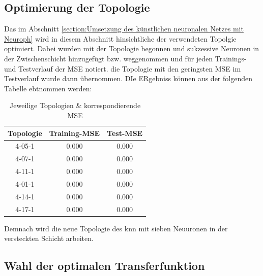 \subsection{Optimierung der Topologie}
Das im Abschnitt \ref{section:Umsetzung des künstlichen neuronalen Netzes mit Neuroph} wird in diesem Abschnitt hinsichtliche der verwendeten Topolgie optimiert. Dabei wurden mit der Topologie begonnen und sukzessive Neuronen in der Zwischenschicht hinzugefügt bzw. weggenommen und für jeden Trainings- und Testverlauf der MSE notiert. die Topologie mit den geringsten MSE im Testverlauf wurde dann übernommen. DIe ERgebniss können aus der folgenden Tabelle ebtnommen werden:


\begin{table}[H]
  \centering
  \begin{tabular}{|c|c|c|}
  \hline 
  \rule[0ex]{0pt}{2.5ex} Topologie & Training-MSE & Test-MSE \\ 
  \hline 
  \rule[0ex]{0pt}{2.5ex} 4-05-1 & 0.000 & 0.000 \\ 
  \hline 
  \rule[0ex]{0pt}{2.5ex} 4-07-1 & 0.000 & 0.000 \\ 
  \hline 
  \rule[0ex]{0pt}{2.5ex} 4-11-1 & 0.000 & 0.000 \\ 
  \hline 
   \rule[0ex]{0pt}{2.5ex} 4-01-1 & 0.000 & 0.000 \\ 
  \hline 
  \rule[0ex]{0pt}{2.5ex} 4-14-1 & 0.000 & 0.000 \\ 
  \hline 
  \rule[0ex]{0pt}{2.5ex} 4-17-1 & 0.000 & 0.000 \\ 
  \hline 
  \end{tabular} 
  \caption{Jeweilige Topologien \& korrespondierende MSE}
  \label{tab:TOPMSE}
\end{table}


Demnach wird die neue Topologie des \acs{knn} mit sieben Neuuronen in der versteckten Schicht arbeiten.



\subsection{Wahl der optimalen Transferfunktion} 
\label{subsection:Wahl der optimalen Transferfunktion} 


